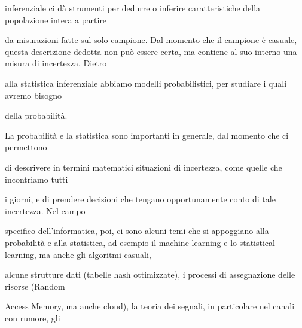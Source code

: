 \documentclass[a4paper,portrait,12pt]{article}
\begin{document}
\begin{flushleft}
inferenziale ci d\`{a} strumenti per dedurre o inferire caratteristiche della popolazione intera a partire
\end{flushleft}


\begin{flushleft}
da misurazioni fatte sul solo campione. Dal momento che il campione \`{e} casuale, questa descrizione dedotta non pu\`{o} essere certa, ma contiene al suo interno una misura di incertezza. Dietro
\end{flushleft}


\begin{flushleft}
alla statistica inferenziale abbiamo modelli probabilistici, per studiare i quali avremo bisogno
\end{flushleft}


\begin{flushleft}
della probabilit\`{a}.
\end{flushleft}


\begin{flushleft}
La probabilit\`{a} e la statistica sono importanti in generale, dal momento che ci permettono
\end{flushleft}


\begin{flushleft}
di descrivere in termini matematici situazioni di incertezza, come quelle che incontriamo tutti
\end{flushleft}


\begin{flushleft}
i giorni, e di prendere decisioni che tengano opportunamente conto di tale incertezza. Nel campo
\end{flushleft}


\begin{flushleft}
specifico dell'informatica, poi, ci sono alcuni temi che si appoggiano alla probabilit\`{a} e alla statistica, ad esempio il machine learning e lo statistical learning, ma anche gli algoritmi casuali,
\end{flushleft}


\begin{flushleft}
alcune strutture dati (tabelle hash ottimizzate), i processi di assegnazione delle risorse (Random
\end{flushleft}


\begin{flushleft}
Access Memory, ma anche cloud), la teoria dei segnali, in particolare nel canali con rumore, gli
\end{flushleft}
\end{document}
